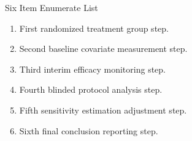 \documentclass[14pt,t]{beamer}
\begin{document}
\begin{frame}{Six Item Enumerate List}
\begin{enumerate}
\item First randomized treatment group step.
\item Second baseline covariate measurement step.
\item Third interim efficacy monitoring step.
\item Fourth blinded protocol analysis step.
\item Fifth sensitivity estimation adjustment step.
\item Sixth final conclusion reporting step.
\end{enumerate}
\end{frame}
\end{document}
